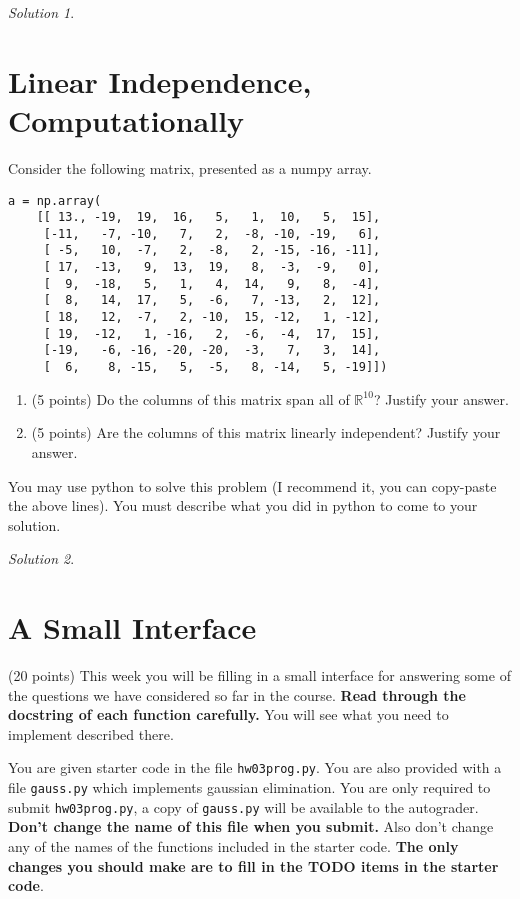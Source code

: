 \documentclass{article}
\theoremstyle{remark}
\newtheorem*{solution}{Solution}
\begin{document}
\begin{solution}
\end{solution}

\pagebreak
\section{Linear Independence, Computationally}

Consider the following matrix, presented as a numpy array.
\begin{lstlisting}
a = np.array(
    [[ 13., -19,  19,  16,   5,   1,  10,   5,  15],
     [-11,   -7, -10,   7,   2,  -8, -10, -19,   6],
     [ -5,   10,  -7,   2,  -8,   2, -15, -16, -11],
     [ 17,  -13,   9,  13,  19,   8,  -3,  -9,   0],
     [  9,  -18,   5,   1,   4,  14,   9,   8,  -4],
     [  8,   14,  17,   5,  -6,   7, -13,   2,  12],
     [ 18,   12,  -7,   2, -10,  15, -12,   1, -12],
     [ 19,  -12,   1, -16,   2,  -6,  -4,  17,  15],
     [-19,   -6, -16, -20, -20,  -3,   7,   3,  14],
     [  6,    8, -15,   5,  -5,   8, -14,   5, -19]])
\end{lstlisting}

\begin{enumerate}
\item (5 points) Do the columns of this matrix span all of $\mathbb R^{10}$? Justify your answer.
\item (5 points) Are the columns of this matrix linearly independent? Justify your answer.
\end{enumerate}
You may use python to solve this problem (I recommend it, you can copy-paste the above lines).
You must describe what you did in python to come to your solution.

\begin{solution}
\end{solution}

\pagebreak
\section{A Small Interface}

(20 points) This week you will be filling in a small interface for answering some of the questions we have considered so far in the course.
\textbf{Read through the docstring of each function carefully.}
You will see what you need to implement described there.

You are given starter code in the file \texttt{hw03prog.py}.
You are also provided with a file \texttt{gauss.py} which implements gaussian elimination.
You are only required to submit \texttt{hw03prog.py}, a copy of \texttt{gauss.py} will be available to the autograder.
\textbf{Don't change the name of this file when you submit.}
Also don't change any of the names of the functions included in the starter code.
\textbf{The only changes you should make are to fill in the TODO items in the starter code}.
\end{document}
